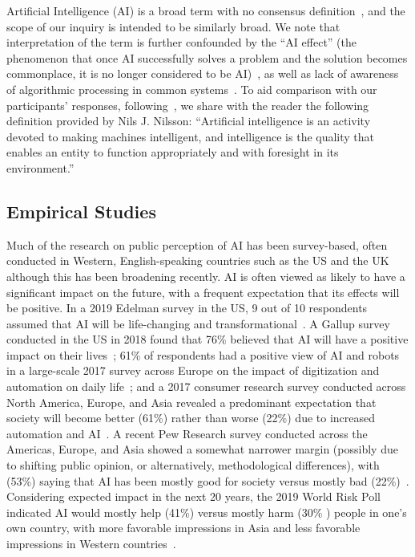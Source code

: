\documentclass[sigconf]{acmart}
\begin{document}
Artificial Intelligence (AI) is a broad term with no consensus definition~\cite{edelman2019, fast2017long, stone2016artificial},
and the scope of our inquiry is intended to be similarly broad.
We note that interpretation of the term is further confounded by the ``AI effect'' (the phenomenon that once AI successfully solves a problem and the solution becomes commonplace, it is no longer considered to be AI)~\cite{mccorduck2004machines}, as well as lack of awareness of algorithmic processing in common systems~\cite{eslami2015always, rader2015understanding, warshaw2016intuitions}. 
To aid comparison with our participants' responses,
following~\cite{stone2016artificial}, we share with the reader the following definition provided by Nils J. Nilsson: ``Artificial intelligence is an activity devoted to making machines intelligent, and intelligence is the quality that enables an entity to function appropriately and with foresight in its environment.''~\cite{nils2009}

\subsection{Empirical Studies}
Much of the research on public perception of AI has been survey-based, often conducted in Western, English-speaking countries such as the US and the UK~\cite{blumberg2019, cave2019, edelman2019, zhang2019artificial, northeastern2018} although this has been broadening recently.
AI is often viewed as likely to have a significant impact on the future, with a frequent expectation that its effects will be positive.
In a 2019 Edelman survey in the US, 9 out of 10 respondents assumed that AI will be life-changing and transformational~\cite{edelman2019}.
A Gallup survey conducted in the US in 2018 found that 76\% believed that AI will have a positive impact on their lives~\cite{northeastern2018}; 61\% of respondents had a positive view of AI and robots in a large-scale 2017 survey across Europe on the impact of digitization and automation on daily life~\cite{european2017}; and a 2017 consumer research survey conducted across North America, Europe, and Asia revealed a predominant expectation that society will become better (61\%) rather than worse (22\%) due to increased automation and AI~\cite{arm2017}. A recent Pew Research survey conducted across the Americas, Europe, and Asia showed a somewhat narrower margin (possibly due to shifting public opinion, or alternatively, methodological differences), with (53\%) saying that AI has been mostly good for society versus mostly bad (22\%)~\cite{funk2020}. Considering expected impact in the next 20 years, the 2019 World Risk Poll indicated AI would mostly help (41\%) versus mostly harm (30\% ) people in one's own country, with more favorable impressions in Asia and less favorable impressions in Western countries~\cite{lloyds2020, neudert2020}.
\end{document}
